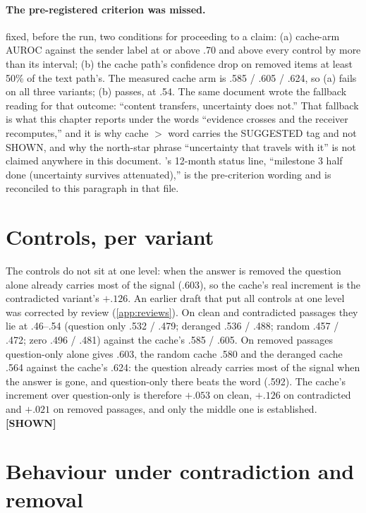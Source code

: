 \documentclass[11pt,a4paper]{report}
\newcommand{\SHOWN}{\textcolor{shownc}{\textbf{\scriptsize[SHOWN]}}}
\begin{document}
\paragraph{The pre-registered criterion was missed.}  fixed, before the run, two conditions for proceeding to a claim: (a) cache-arm AUROC against the sender label at or above .70 and above every control by more than its interval; (b) the cache path's confidence drop on removed items at least 50\% of the text path's. The measured cache arm is .585 / .605 / .624, so (a) fails on all three variants; (b) passes, at .54. The same document wrote the fallback reading for that outcome: ``content transfers, uncertainty does not.'' That fallback is what this chapter reports under the words ``evidence crosses and the receiver recomputes,'' and it is why cache $>$ word carries the SUGGESTED tag and not SHOWN, and why the north-star phrase ``uncertainty that travels with it'' is not claimed anywhere in this document. 's 12-month status line, ``milestone 3 half done (uncertainty survives attenuated),'' is the pre-criterion wording and is reconciled to this paragraph in that file.

\section{Controls, per variant}

The controls do not sit at one level: when the answer is removed the question alone already carries most of the signal (.603), so the cache's real increment is the contradicted variant's $+.126$. An earlier draft that put all controls at one level was corrected by review (\cref{app:reviews}). On clean and contradicted passages they lie at .46--.54 (question only .532 / .479; deranged .536 / .488; random .457 / .472; zero .496 / .481) against the cache's .585 / .605. On removed passages question-only alone gives .603, the random cache .580 and the deranged cache .564 against the cache's .624: the question already carries most of the signal when the answer is gone, and question-only there beats the word (.592). The cache's increment over question-only is therefore $+.053$ on clean, $+.126$ on contradicted and $+.021$ on removed passages, and only the middle one is established. \SHOWN

\section{Behaviour under contradiction and removal}
\end{document}
